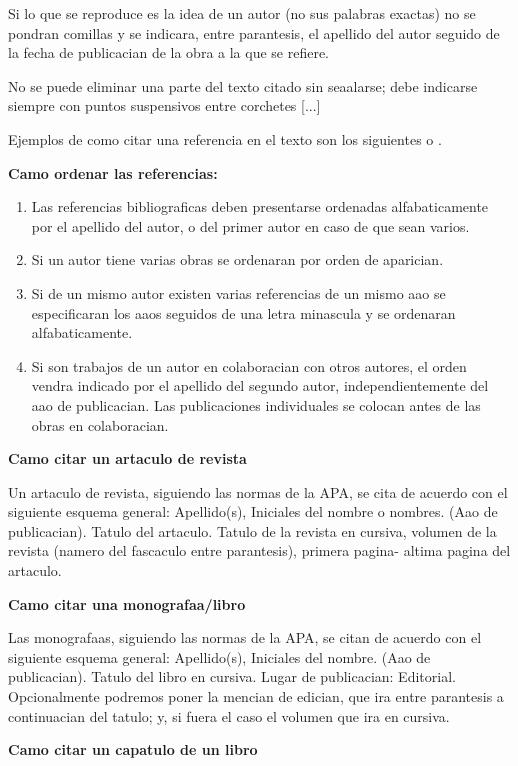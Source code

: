 \documentclass[spanish,12pt, a4paper,twoside]{paper}
\begin{document}
Si lo que se reproduce es la idea de un autor (no sus palabras exactas) no se pondran comillas y se indicara, entre parantesis, el apellido del autor seguido de la fecha de publicacian de la obra a la que se refiere.

No se puede eliminar una parte del texto citado sin seaalarse; debe indicarse siempre con puntos suspensivos entre corchetes [...]

Ejemplos de como citar una referencia en el texto son los siguientes \cite{Ashtiani2014} o \cite{Ashtiani2014,Mateos2009,Vicente2016}.


\bigskip
{\bf Camo ordenar las referencias:}
\begin{enumerate}
\item Las referencias bibliograficas deben presentarse ordenadas alfabaticamente por el apellido del autor, o del primer autor en caso de que sean varios.
\item Si un autor tiene varias obras se ordenaran por orden de aparician.
\item Si de un mismo autor existen varias referencias de un mismo aao se especificaran los aaos seguidos de una letra minascula y se ordenaran alfabaticamente.
\item Si son trabajos de un autor en colaboracian con otros autores, el orden vendra indicado por el apellido del segundo autor, independientemente del aao de publicacian. Las publicaciones individuales se colocan antes de las obras en colaboracian.
\end{enumerate}

\bigskip
{\bf Camo citar un artaculo de revista}

Un artaculo de revista, siguiendo las normas de la APA, se cita de acuerdo con el siguiente esquema general:
Apellido(s), Iniciales del nombre o nombres. (Aao de publicacian). Tatulo del artaculo. Tatulo de la revista en cursiva, volumen de la revista (namero del fascaculo entre parantesis), primera pagina- altima pagina del artaculo.

\bigskip
{\bf Camo citar una monografaa/libro}

Las monografaas, siguiendo las normas de la APA, se citan de acuerdo con el siguiente esquema general:
Apellido(s), Iniciales del nombre. (Aao de publicacian). Tatulo del libro en cursiva. Lugar de publicacian: Editorial.
Opcionalmente podremos poner la mencian de edician, que ira entre parantesis a continuacian del tatulo; y, si fuera el caso el volumen que ira en cursiva.

\bigskip
{\bf Camo citar un capatulo de un libro}
\end{document}
